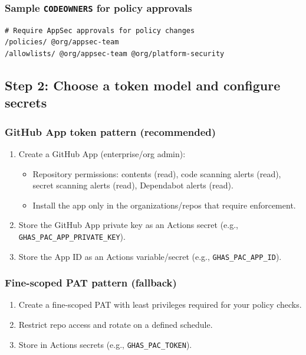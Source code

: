 \documentclass[11pt]{article}
\renewcommand{\cmd}[1]{\texttt{#1}}
\begin{document}
\subsubsection{Sample \cmd{CODEOWNERS} for policy approvals}

\begin{verbatim}
# Require AppSec approvals for policy changes
/policies/ @org/appsec-team
/allowlists/ @org/appsec-team @org/platform-security
\end{verbatim}

\subsection{Step 2: Choose a token model and configure secrets}

\subsubsection{GitHub App token pattern (recommended)}

\begin{enumerate}[leftmargin=*]
  \item Create a GitHub App (enterprise/org admin):
    \begin{itemize}
      \item Repository permissions: contents (read), code scanning alerts (read), secret scanning alerts (read), Dependabot alerts (read).
      \item Install the app only in the organizations/repos that require enforcement.
    \end{itemize}
  \item Store the GitHub App private key as an Actions secret (e.g., \cmd{GHAS\_PAC\_APP\_PRIVATE\_KEY}).
  \item Store the App ID as an Actions variable/secret (e.g., \cmd{GHAS\_PAC\_APP\_ID}).
\end{enumerate}

\subsubsection{Fine-scoped PAT pattern (fallback)}

\begin{enumerate}[leftmargin=*]
  \item Create a fine-scoped PAT with least privileges required for your policy checks.
  \item Restrict repo access and rotate on a defined schedule.
  \item Store in Actions secrets (e.g., \cmd{GHAS\_PAC\_TOKEN}).
\end{enumerate}
\end{document}
